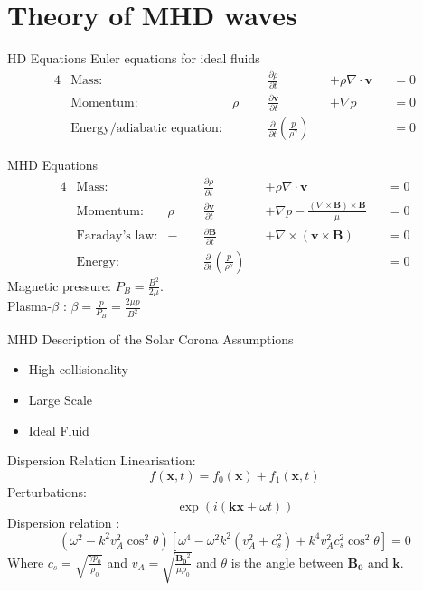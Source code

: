 \documentclass{beamer}
\begin{document}
\section{Theory of MHD waves}

\begin{frame}{HD Equations}
Euler equations for ideal fluids
\begin{alignat*}{4}
	&\text{Mass:} &\quad\quad &\frac{\partial \rho}{\partial t} & &+ \rho \nabla \cdot \mathbf v & &=  0 \\
	&\text{Momentum:} & \rho& \frac{\partial \mathbf v}{\partial t} & &+ \nabla p & &= 0\\
	&\text{Energy/adiabatic equation:} & &\frac{\partial }{\partial t} \left( \frac{p}{\rho^{\gamma}} \right)  & & & &= 0
\end{alignat*}
\end{frame}
\begin{frame}{MHD Equations}
    \begin{alignat*}{4}
	&\text{Mass:} &\quad\quad &\frac{\partial \rho}{\partial t} & & +\rho \nabla \cdot \mathbf v& &= 0 \\ 	
	&\text{Momentum:} & \rho& \frac{\partial \mathbf v}{\partial t} & &+ \nabla p - \frac{(\nabla \times \mathbf B) \times \mathbf B}{\mu}& &=  0  \\
	&\text{Faraday's law:} & -&\frac{\partial \mathbf B}{\partial t} & &+ \nabla \times (\mathbf v \times \mathbf B)& &= 0 \\
	&\text{Energy:} & &\frac{\partial }{\partial t} \left( \frac{p}{\rho^{\gamma}} \right)  & & & &= 0 
\end{alignat*}
Magnetic pressure: $P_B = \frac{B^2}{2\mu}$. \\Plasma-$\beta$ : $\beta = \frac{p}{P_B} = \frac{2\mu p}{B^2}$
\end{frame}
\begin{frame}{MHD Description of the Solar Corona}
    \centering
    Assumptions
    \begin{itemize}
        \item High collisionality
        \item Large Scale
        \item Ideal Fluid
    \end{itemize}
\end{frame}
\begin{frame}{Dispersion Relation}
    Linearisation:
        \begin{equation*}
            f(\mathbf{x},t) = f_0(\mathbf{x}) + f_1(\mathbf{x},t)
        \end{equation*}
    Perturbations:
        \begin{equation*}
            \exp(i(\mathbf{kx} + \omega t))
        \end{equation*}
	Dispersion relation \cite{Fitzpatricknotes}:
        \begin{equation*}
	        (\omega^2 - k^2 v_A^2 \cos^2 \theta)\left[ \omega^{4} - \omega^2k^2(v_A^2 + c_s^2) + k^{4}v_A^2c_s^2\cos^2\theta \right]  = 0
        \end{equation*}
        Where $c_s = \sqrt{\frac{\gamma p_0}{\rho_0}}$ and $v_A = \sqrt{\frac{\mathbf{B_0}^2}{\mu\rho_0}}$ and $\theta$ is the angle between $\mathbf{B_0}$ and $\mathbf{k}$.
\end{frame}
\end{document}

